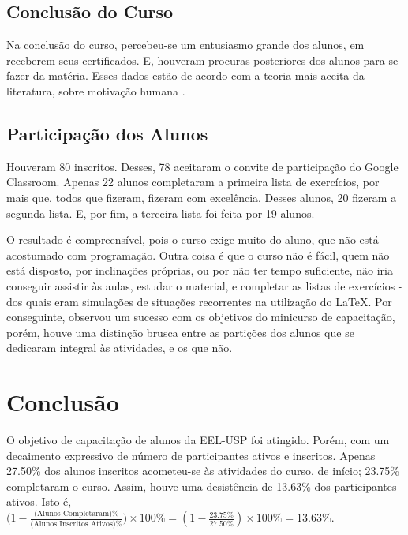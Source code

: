 \documentclass[
12pt,				%
openright,			%
oneside,			%
a4paper,			%
english,			%
french,				%
spanish,			%
brazil,				%
]{abntex2}
\begin{document}
\section{Conclusão do Curso}

Na conclusão do curso, percebeu-se um entusiasmo grande dos alunos, em receberem seus certificados. E, houveram procuras posteriores dos alunos para se fazer da matéria. Esses dados estão de acordo com a teoria mais aceita da literatura, sobre motivação humana \cite{hendijani2016intrinsic}.


\section{Participação dos Alunos}

Houveram 80 inscritos. Desses, 78 aceitaram o
convite de participação do Google Classroom. Apenas 22 alunos
completaram a primeira lista de exercícios, por mais que, todos que
fizeram, fizeram com excelência. Desses alunos, 20 fizeram a segunda
lista. E, por fim, a terceira lista foi feita por 19 alunos.

O resultado é compreensível, pois o curso exige muito do aluno, que
não está acostumado com programação. Outra coisa é que o curso não é
fácil, quem não está disposto, por
inclinações próprias, ou por não ter tempo suficiente, não iria
conseguir assistir às aulas, estudar o material, e completar as listas
de exercícios - dos quais eram simulações de situações recorrentes na
utilização do \LaTeX. Por conseguinte, observou um sucesso com os
objetivos do minicurso de capacitação, porém, houve uma distinção brusca entre as
partições dos alunos que se dedicaram integral às atividades, e os que
não.


\chapter{Conclusão}

O objetivo de capacitação de alunos da EEL-USP foi atingido. Porém,
com um decaimento expressivo de número de participantes ativos e
inscritos. Apenas 27.50\% dos alunos inscritos acometeu-se às atividades
do curso, de início; 23.75\%  completaram o curso. Assim, houve uma
desistência de 13.63\% dos participantes ativos. Isto é, \\
$\big(1-\frac{\text{(Alunos Completaram)\%}}{\text{(Alunos Inscritos
    Ativos)\%}} \big) \times 100\% = (1 - \frac{23.75\%}{27.50\%}) \times 100\% = 13.63\%$.
\end{document}
